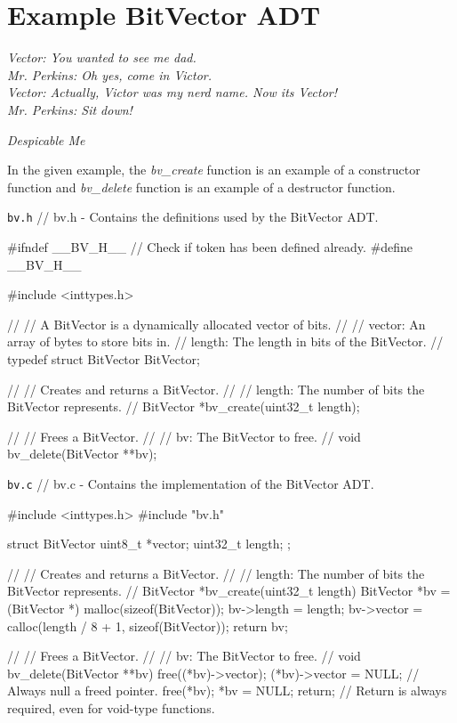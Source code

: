 \documentclass[11pt]{article}
\begin{document}
\section{Example BitVector ADT}

\textwidth
\epigraph{\emph{
Vector: You wanted to see me dad. \\
Mr. Perkins: Oh yes, come in Victor. \\
Vector: Actually, Victor was my nerd name.  Now its Vector! \\
Mr. Perkins: Sit down!
}}{\emph{Despicable Me}}

\noindent In the given example, the \emph{bv\_create} function is an example of a constructor function and 
 \emph{bv\_delete} function is an example of a destructor function.

\begin{codelisting}{\texttt{bv.h}}
// bv.h - Contains the definitions used by the BitVector ADT.

#ifndef __BV_H__ // Check if token has been defined already.
#define __BV_H__

#include <inttypes.h>

//
// A BitVector is a dynamically allocated vector of bits.
//
// vector: An array of bytes to store bits in.
// length: The length in bits of the BitVector.
//
typedef struct BitVector BitVector;

//
// Creates and returns a BitVector.
//
// length: The number of bits the BitVector represents.
//
BitVector *bv_create(uint32_t length);

//
// Frees a BitVector.
//
// bv: The BitVector to free.
//
void bv_delete(BitVector **bv);
\end{codelisting}

\begin{codelisting}{\texttt{bv.c}}
// bv.c - Contains the implementation of the BitVector ADT.

#include <inttypes.h>
#include "bv.h"

struct BitVector {
    uint8_t *vector;
    uint32_t length;
};

//
// Creates and returns a BitVector.
//
// length: The number of bits the BitVector represents.
//
BitVector *bv_create(uint32_t length) {
    BitVector *bv = (BitVector *) malloc(sizeof(BitVector));
    bv->length = length;
    bv->vector = calloc(length / 8 + 1, sizeof(BitVector));
    return bv;
}

//
// Frees a BitVector.
//
// bv: The BitVector to free.
//
void bv_delete(BitVector **bv) {
    free((*bv)->vector);
    (*bv)->vector = NULL; // Always null a freed pointer.
    free(*bv);
    *bv = NULL;
    return; // Return is always required, even for void-type functions.
}
\end{codelisting}
\end{document}
